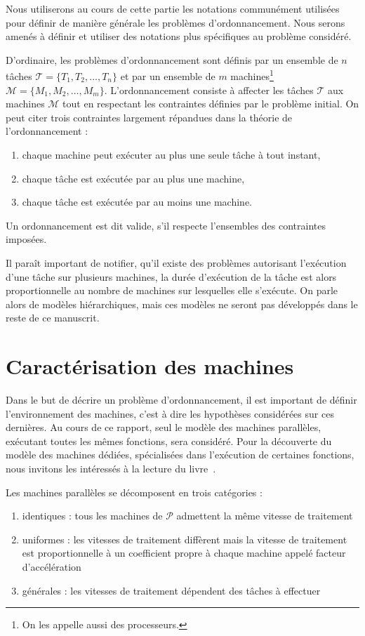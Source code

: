 \documentclass[a4paper,11pt]{report}
\begin{document}
Nous utiliserons au cours de cette partie les notations communément utilisées pour définir de
manière générale les problèmes d'ordonnancement. Nous serons amenés à définir et utiliser des
notations plus spécifiques au problème considéré.

D'ordinaire, les problèmes d'ordonnancement sont définis par un ensemble de $n$ tâches $\mathcal{T} =
\{T_1, T_2, \dots, T_n\}$ et par un ensemble de $m$ machines\footnote{On les appelle aussi des
processeurs.} $\mathcal{M} = \{M_1, M_2, \dots, M_m\}$. L'ordonnancement consiste à affecter les
tâches $\mathcal{T}$ aux machines $\mathcal{M}$ tout en respectant les contraintes définies par
le problème initial. On peut citer trois contraintes largement répandues dans la théorie de
l'ordonnancement :
\begin{enumerate}
    \item chaque machine peut exécuter au plus une seule tâche à tout instant,
    \item chaque tâche est exécutée par au plus une machine,
    \item chaque tâche est exécutée par au moins une machine.
\end{enumerate}
Un ordonnancement est dit valide, s'il respecte l'ensembles des contraintes imposées.

Il paraît important de notifier, qu'il existe des problèmes autorisant l'exécution d'une tâche sur
plusieurs machines, la durée d'exécution de la tâche est alors proportionnelle au nombre de
machines sur lesquelles elle s'exécute. On parle alors de modèles hiérarchiques, mais ces modèles
ne seront pas développés dans le reste de ce manuscrit.

\section{Caractérisation des machines}

Dans le but de décrire un problème d'ordonnancement, il est important de définir l'environnement des
machines, c'est à dire les hypothèses considérées sur ces dernières. Au cours de ce rapport, seul
le modèle des machines parallèles, exécutant toutes les mêmes fonctions, sera considéré. Pour la
découverte du modèle des machines dédiées, spécialisées dans l'exécution de certaines fonctions,
nous invitons les intéressés à la lecture du livre~\cite{blazewicz_handbook_2007}.

Les machines parallèles se décomposent en trois catégories :
\begin{enumerate}
    \item identiques : tous les machines de $\mathcal{P}$ admettent la même vitesse de traitement
    \item uniformes : les vitesses de traitement diffèrent mais la vitesse de traitement est
        proportionnelle à un coefficient propre à chaque machine appelé facteur d'accélération
    \item générales : les vitesses de traitement dépendent des tâches à effectuer
\end{enumerate}
\end{document}
